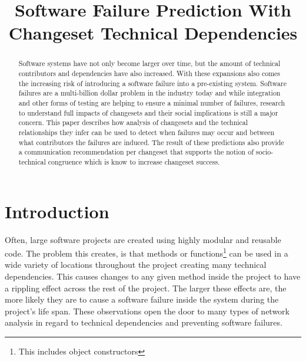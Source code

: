 \documentclass[conference]{IEEEtran}
\begin{document}
\title{Software Failure Prediction With Changeset Technical Dependencies}

\author{
\and
{}
\and
{}
}

\maketitle


\begin{abstract}
Software systems have not only become larger over time, but the amount of
technical contributors and dependencies have also increased. With these expansions also comes
the increasing risk of introducing a software failure into a pre-existing system.
Software failures are a multi-billion dollar problem in the industry today and while integration and
other forms of testing are helping to ensure a minimal number of failures, research to understand
full impacts of changesets and their social implications is still a major concern. This paper describes
how analysis of changesets and the technical relationships they infer can be used to detect when failures 
may occur and between what contributors the failures are induced. The result of these predictions
also provide a communication recommendation per changeset that supports the notion of
socio-technical congruence which is know to increase changeset success.
\end{abstract}


\section{Introduction}

Often, large software projects are created using highly modular and 
reusable code. The problem this creates, is that methods or functions\footnote{This includes object constructors} 
can be used in a wide variety of locations throughout the project creating many technical 
dependencies.  This causes changes to any given method inside the project to have a rippling 
effect across the rest of the project\cite{Acharya:2011:PCI}. The larger these effects are,
the more likely they are to cause a software failure inside the system during the project's
life span\cite{Zimmermann:2008:PDU}. These observations open the door to many types
of network analysis in regard to technical dependencies and preventing software failures.
\end{document}
